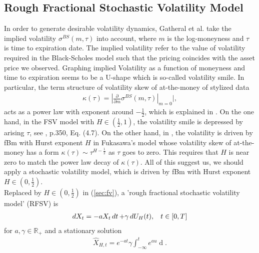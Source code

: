 \documentclass[a4paper, twoside, 11pt]{article}
\theoremstyle{definition}
\begin{document}
\subsection{Rough Fractional Stochastic Volatility Model}
In order to generate desirable volatility dynamics, Gatheral et al.\cite{Gatheral} take the implied volatility $\sigma^{BS}(m, \tau)$ into account, where $m$ is the log-moneyness and $\tau$ is time to expiration date. The implied volatility refer to the value of volatility required in the Black-Scholes model such that the pricing coincides with the asset price we observed.  Graphing implied Volatility as a function of moneyness and time to expiration seems to be a U-shape which is so-called volatility smile. In particular, the term structure of volatility skew of at-the-money of stylized data
\begin{eqnarray*}
  \kappa(\tau)=|\frac{\partial}{\partial m}\sigma^{BS}(m, \tau)|_{m=0}|,
\end{eqnarray*}
acts as a power law with exponent around $-\frac{1}{2}$, which is explained in \cite{gradin}. On the one hand, in the FSV model with $H \in (\frac{1}{2}, 1)$, the volatility smile is depressed by arising $\tau$, see \cite{comteetla}, p.350, Eq. (4.7). On the other hand,  in \cite{fukasawa}, the volatility is driven by fBm with Hurst exponent $H$ in Fukasawa's model whose volatility skew of at-the-money has a form $\kappa(\tau) \sim \tau^{H-\frac{1}{2}}$ as $\tau$ goes to zero. This requires that $H$ is near zero to match the power law decay of $\kappa(\tau)$.  All of this suggest us, we should apply a stochastic volatility model, which is driven by fBm with Hurst exponent $H \in (0, \frac{1}{2})$.\\
Replaced by $H \in (0, \frac{1}{2})$ in (\ref{sec:fv}), a 'rough fractional stochastic volatility model' (RFSV) is
\begin{eqnarray}
  \mathop{dX_t} = -a X_t \mathop{dt} + \gamma \mathop{dU_H(t)},\hspace{3mm} t\in[0, T]
  \label{sec:rfm}
\end{eqnarray}
for $a,\gamma \in \mathbb{R}_+$ and a stationary solution
\begin{eqnarray}
\hat{X}_{H,t}=e^{-at}\gamma\int_{-\infty}^t e^{au}\mathop{dU_H(u)}.
\label{sec:rfm2}
\end{eqnarray}
\end{document}
